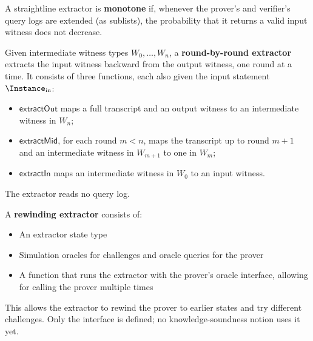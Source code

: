 \begin{definition}
    \label{def:monotone_straightline_extractor}
    A straightline extractor is \textbf{monotone} if, whenever the prover's and verifier's query
    logs are extended (as sublists), the probability that it returns a valid input witness does
    not decrease.
    \leanok
\end{definition}

\begin{definition}
    \label{def:rbr_extractor}
    Given intermediate witness types \(W_0, \ldots, W_n\), a \textbf{round-by-round extractor}
    extracts the input witness backward from the output witness, one round at a time. It consists
    of three functions, each also given the input statement \(\Instance_{\text{in}}\):
    \begin{itemize}
        \item \(\mathsf{extractOut}\) maps a full transcript and an output witness to an
        intermediate witness in \(W_n\);
        \item \(\mathsf{extractMid}\), for each round \(m < n\), maps the transcript up to round \(m+1\)
        and an intermediate witness in \(W_{m+1}\) to one in \(W_m\);
        \item \(\mathsf{extractIn}\) maps an intermediate witness in \(W_0\) to an input witness.
    \end{itemize}
    The extractor reads no query log.
    \leanok
\end{definition}

\begin{definition}
    \label{def:rewinding_extractor}
    A \textbf{rewinding extractor} consists of:
    \begin{itemize}
        \item An extractor state type
        \item Simulation oracles for challenges and oracle queries for the prover
        \item A function that runs the extractor with the prover's oracle interface, allowing for calling the prover multiple times
    \end{itemize}
    This allows the extractor to rewind the prover to earlier states and try different challenges.
    Only the interface is defined; no knowledge-soundness notion uses it yet.
    \leanok
\end{definition}

